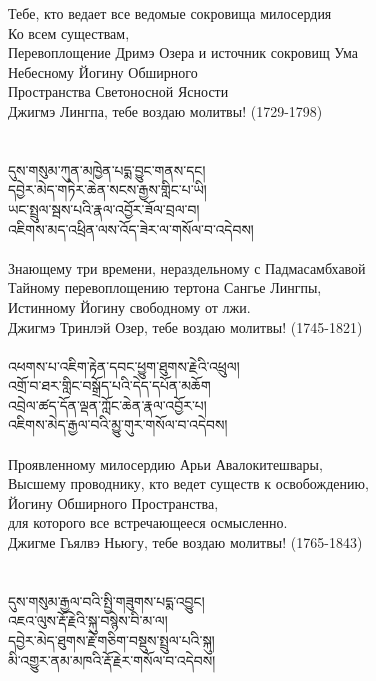 \ru
Тебе, кто ведает все ведомые сокровища милосердия\\
Ко всем существам,\\
Перевоплощение Дримэ Озера и источник сокровищ Ума \\
Небесному Йогину Обширного \\
Пространства Светоносной Ясности\\
Джигмэ Лингпа, тебе воздаю молитвы! (1729-1798)\\
\\
\\
\ti
དུས་གསུམ་ཀུན་མཁྱེན་པདྨ་བྱུང་གནས་དང། \\
དབྱེར་མེད་གཏེར་ཆེན་སངས་རྒྱས་གླིང་པ་ཡི།\\
ཡང་སྤྲུལ་སྦས་པའི་རྣལ་འབྱོར་ཟོལ་བྲལ་བ།\\
འཇིགས་མད་འཕྲིན་ལས་འོད་ཟེར་ལ་གསོལ་བ་འདེབས།\\
\\
\ru
Знающему три времени, нераздельному с Падмасамбхавой\\
Тайному перевоплощению тертона Сангье Лингпы,\\
Истинному Йогину свободному от лжи.\\
Джигмэ Тринлэй Озер, тебе воздаю молитвы! (1745-1821)\\
\\
\newpage
\ti
འཕགས་པ་འཇིག་རྟེན་དབང་ཕྱུག་ཐུགས་རྗེའི་འཕྲུལ། \\
འགྲོ་བ་ཐར་གླིང་བསྒྲོད་པའི་དེད་དཔོན་མཆོག \\
འབྲེལ་ཚད་དོན་ལྡན་ཀློང་ཆེན་རྣལ་འབྱོར་པ། \\
འཇིགས་མེད་རྒྱལ་བའི་མྱུ་གུར་གསོལ་བ་འདེབས།\\
\\
\ru
Проявленному милосердию Арьи Авалокитешвары,\\
Высшему проводнику, кто ведет существ к освобождению,\\
Йогину Обширного Пространства,\\
для которого все встречающееся осмысленно.\\
Джигме Гьялвэ Ньюгу, тебе воздаю молитвы! (1765-1843)\\
\\
\\
\ti
དུས་གསུམ་རྒྱལ་བའི་སྤྱི་གཟུགས་པདྨ་འབྱུང། \\
འཇའ་ལུས་རྡོ་རྗེའི་སྐུ་བསྙེས་བི་མ་ལ། \\
དབྱེར་མེད་ཐུགས་རྗེ་གཅིག་བསྡུས་སྤྲུལ་པའི་སྐུ། \\
མི་འགྱུར་ནམ་མཁའི་རྡོ་རྗེར་གསོལ་བ་འདེབས།\\
